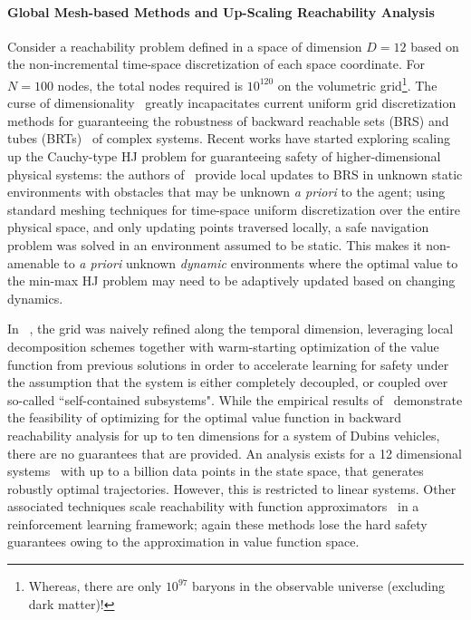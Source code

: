 \paragraph{Global Mesh-based Methods and Up-Scaling Reachability Analysis}
Consider a reachability problem defined in a space of dimension $D=12$ based on the non-incremental time-space discretization of each space coordinate. For $N=100$ nodes, the total nodes required is $10^{120}$ on the volumetric grid\footnote{Whereas, there are only $10^{97}$ baryons in the observable universe (excluding dark matter)!}. The curse of dimensionality~\citet{Bellman1957} greatly incapacitates current uniform grid discretization methods for guaranteeing the robustness of backward reachable sets (BRS) and tubes (BRTs)~\citet{Mitchell2005} of complex systems. 
Recent works have started exploring scaling up the Cauchy-type HJ problem for guaranteeing safety of higher-dimensional physical systems: the authors of~\citet{Bajcsy} provide local updates to BRS in  unknown static environments with obstacles that may be unknown \textit{a priori} to the agent; using standard meshing techniques for time-space uniform discretization over the entire physical space, and only updating points traversed locally, a safe navigation problem was solved in an environment assumed to be static. 
This makes it non-amenable to \textit{a priori} unknown \textit{dynamic} environments where the optimal value to the min-max HJ problem may need to be adaptively updated based on changing dynamics. 

In ~\citet{SylviaScalability}, the grid was naively refined along the temporal dimension, leveraging local decomposition schemes together with warm-starting optimization of the value function from previous solutions in order to accelerate learning for safety under the assumption that the system is either completely decoupled, or coupled over so-called ``self-contained subsystems".  While the empirical results of~\citet{Bansal} demonstrate the feasibility of optimizing for the optimal value function in backward reachability analysis for up to ten dimensions for a system of Dubins vehicles, there are no guarantees that are provided. An analysis exists for a 12 dimensional systems~\citet{KaynamaScalable} with up to a billion data points in the state space, that generates robustly optimal trajectories. However, this is restricted to {linear systems}. Other associated techniques scale reachability with function approximators~\citet{FisacTAC, FisacICRA} in a reinforcement learning framework; again these methods lose the hard safety guarantees owing to the approximation in value function space.  

